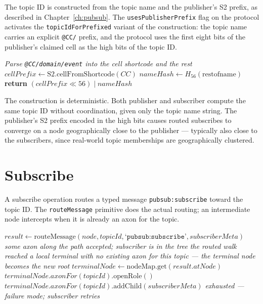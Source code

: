 \documentclass[twoside,nobib]{tufte-book}
\begin{document}
The topic ID is constructed from the topic name and the
publisher's S2 prefix, as described in
Chapter~\ref{ch:pubsub}. The \texttt{usesPublisherPrefix} flag on
the protocol activates the \texttt{topicIdForPrefixed} variant of
the construction: the topic name carries an explicit
\texttt{@CC/} prefix, and the protocol uses the first eight bits
of the publisher's claimed cell as the high bits of the topic ID.

\begin{algorithm}
\caption{topicId = topicIdForPrefixed(name)}
\begin{algorithmic}[1]
\State \emph{Parse \texttt{@CC/domain/event} into the cell shortcode and the rest}
\State $\mathit{cellPrefix} \gets \mathrm{S2.cellFromShortcode}(\mathit{CC})$
\State $\mathit{nameHash} \gets H_{56}(\mathrm{rest of name})$
\State \textbf{return} $(\mathit{cellPrefix} \ll 56) \mathbin{|}
       \mathit{nameHash}$
\end{algorithmic}
\end{algorithm}

The construction is deterministic. Both publisher and subscriber
compute the same topic ID without coordination, given only the
topic name string. The publisher's S2 prefix encoded in the high
bits causes routed subscribes to converge on a node geographically
close to the publisher --- typically also close to the subscribers,
since real-world topic memberships are geographically clustered.

\section{Subscribe}

A subscribe operation routes a typed message
\texttt{pubsub:subscribe} toward the topic ID. The
\texttt{routeMessage} primitive does the actual routing; an
intermediate node intercepts when it is already an axon for the
topic.

\begin{algorithm}
\caption{subscribe(node, topicId, subscriberMeta)}
\begin{algorithmic}[1]
\State $\mathit{result} \gets
       \mathrm{routeMessage}(\mathit{node},
       \mathit{topicId},
       \texttt{`pubsub:subscribe'},
       \mathit{subscriberMeta})$
  \State \emph{some axon along the path accepted; subscriber is
        in the tree}
  \State \emph{the routed walk reached a local terminal with no
        existing axon for this topic --- the terminal node
        becomes the new root}
  \State $\mathit{terminalNode} \gets
        \mathrm{nodeMap.get}(\mathit{result}.\mathit{atNode})$
  \State $\mathit{terminalNode}.\mathit{axonFor}(\mathit{topicId})
        .\mathrm{openRole}()$
  \State $\mathit{terminalNode}.\mathit{axonFor}(\mathit{topicId})
        .\mathrm{addChild}(\mathit{subscriberMeta})$
\Else
  \State \emph{exhausted --- failure mode; subscriber retries}
\EndIf
\end{algorithmic}
\end{algorithm}
\end{document}
